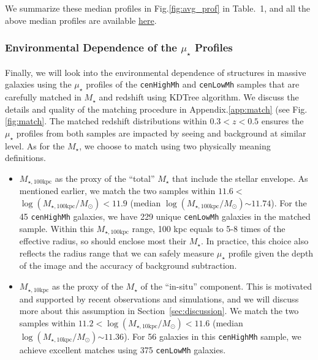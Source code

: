 \documentclass{emulateapj}
\def\rbcg{\texttt{cenHighMh}}
\def\nbcg{\texttt{cenLowMh}}
\def\mstar{{$M_{\star}$}}
\def\minn{{$M_{\star,10\mathrm{kpc}}$}}
\def\mtot{{$M_{\star,100\mathrm{kpc}}$}}
\def\logminn{{$\log (M_{\star,10\mathrm{kpc}}/M_{\odot})$}}
\def\logmtot{{$\log (M_{\star,100\mathrm{kpc}}/M_{\odot})$}}
\def\mden{{$\mu_{\star}$}}
\begin{document}
\begin{CJK*}{UTF8}{gbsn}
    We summarize these median profiles in Fig.\ref{fig:avg_prof} in Table.~1,
    and all the above median profiles are available  
    \href{https://github.com/dr-guangtou/hsc_cenHighMh/tree/master/profiles}{here}.

\subsubsection{Environmental Dependence of the \mden{} Profiles}
    \label{sssec:sbp_mtot}    
    
    Finally, we will look into the environmental dependence of structures in massive 
    galaxies using the \mden{} profiles of the \rbcg{} and \nbcg{} samples that are 
    carefully matched in \mstar{} and redshift using KDTree algorithm. 
    We discuss the details and quality of the matching procedure in 
    Appendix.\ref{app:match} (see Fig.\ref{fig:match}. 
    The matched redshift distributions within $0.3 < z < 0.5$ ensures the \mden{} 
    profiles from both samples are impacted by seeing and background at similar level. 
    As for the \mstar{}, we choose to match using two physically meaning definitions.
    
    \begin{itemize}
        \item \mtot{} as the proxy of the ``total'' \mstar{} that include the stellar 
            envelope.  As mentioned earlier, we match the two samples within 
            $11.6 < $\logmtot{}$<11.9$ (median \logmtot{}$\sim 11.74$).
            For the 45 \rbcg{} galaxies, we have 229 unique \nbcg{} galaxies in the 
            matched sample.
            Within this \mtot{} range, 100 kpc equals to 5-8 times of the effective 
            radius, so should enclose most their \mstar{}. 
            In practice, this choice also reflects the radius range that we can safely 
            measure \mden{} profile given the depth of the image and the accuracy of 
            background subtraction.
        
        \item \minn{} as the proxy of the \mstar{} of the ``in-situ'' component.
            This is motivated and supported by recent observations and simulations, 
            and we will discuss more about this assumption in 
            Section~\ref{sec:discussion}.
            We match the two samples within $11.2 < $\logminn{}$ < 11.6$ 
            (median \logminn{}$\sim 11.36$).
            For 56 galaxies in this \rbcg{} sample, we achieve excellent matches
            using 375 \nbcg{} galaxies.
    \end{itemize}
    

\end{CJK*}
\end{document}
